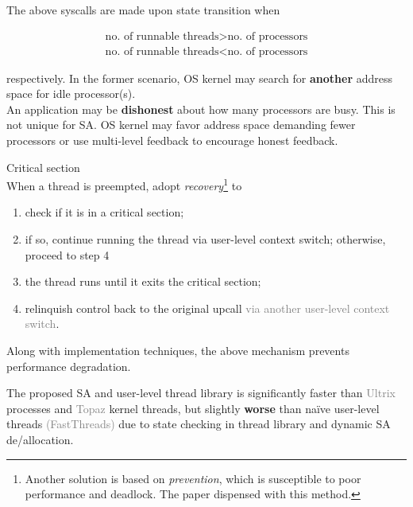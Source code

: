 The above syscalls are made upon state transition when

$$
\begin{matrix}
\text{no. of runnable threads} > \text{no. of processors} \\
\text{no. of runnable threads} < \text{no. of processors}
\end{matrix}
$$

respectively. In the former scenario, OS kernel may search for \textbf{another} address space for idle processor(s). \\

An application may be \textbf{dishonest} about how many processors are busy. This is not unique for SA. OS kernel may favor address space demanding fewer processors or use multi-level feedback to encourage honest feedback.

\begin{example}
Critical section \\

When a thread is preempted, adopt \textit{recovery}\footnote{Another solution is based on \textit{prevention}, which is susceptible to poor performance and deadlock. The paper dispensed with this method.} to

\begin{enumerate}
    \item check if it is in a critical section;
    \item if so, continue running the thread via user-level context switch; otherwise, proceed to step 4 \item the thread runs until it exits the critical section;
    \item relinquish control back to the original upcall \textcolor{gray}{via another user-level context switch}.
\end{enumerate}

Along with implementation techniques, the above mechanism prevents performance degradation.
\end{example}

The proposed SA and user-level thread library is significantly faster than \textcolor{gray}{Ultrix} processes and \textcolor{gray}{Topaz} kernel threads, but slightly \textbf{worse} than na\"ive user-level threads \textcolor{gray}{(FastThreads)} due to state checking in thread library and dynamic SA de/allocation.
